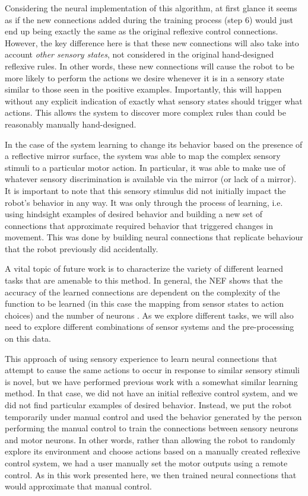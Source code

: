\documentclass{frontiersSCNS}
\begin{document}
Considering the neural implementation of this algorithm, at first glance it 
seems as if the new connections added during the
training process (step 6) would just end up being 
exactly the same as the original reflexive control connections. However, the 
key difference here is that these new connections will also take into 
account \textit{other sensory states}, not considered in the original 
hand-designed reflexive rules. In other words, these new connections will 
cause the robot to be more likely to perform the actions we desire whenever it is in a sensory state similar to those seen in the positive examples. 
Importantly, this will happen without any explicit indication of exactly what 
sensory states should trigger what actions.  This allows the system to
discover more complex rules than could be reasonably manually hand-designed.

In the case of the system learning to change its behavior based on the 
presence of a reflective mirror surface, the system was able to map the 
complex sensory stimuli to a particular motor action.  In particular, it
was able to make use of whatever sensory discrimination is available via
the mirror (or lack of a mirror).  It is important to note that this sensory 
stimulus did not initially impact the robot's behavior in any way. It was 
only through the process of learning, i.e. using hindsight examples of desired 
behavior and building a new set of connections that approximate required 
behavior that triggered changes in movement.  This was done by building neural
connections that replicate behaviour that the robot previously did accidentally.

A vital topic of future work is to characterize the variety of different
learned tasks that are amenable to this method.  In general, the NEF shows
that the accuracy of the learned connections are dependent on the complexity
of the function to be learned (in this case the mapping from sensor states to
action choices) and the number of neurons \citep{eliasmith2004neural}.  As we explore different tasks,
we will also need to explore different combinations of sensor systems and
the pre-processing on this data.  

This approach of using sensory experience to learn neural connections
that attempt to cause the same actions to occur in response to similar
sensory stimuli is novel, but we have performed previous work \citep{conradt2014trainable}
with a somewhat similar learning method. In that case, we did not have an 
initial reflexive control system, and we did not find particular examples of 
desired behavior. Instead, we put the robot temporarily under manual control 
and used the behavior generated by the person performing the manual control 
to train the connections between sensory neurons and motor neurons.  In other
words, rather than allowing the robot to randomly explore its environment and
choose actions based on a manually created reflexive control system, we had
a user manually set the motor outputs using a remote control.  As in this work
presented here, we then trained neural connections that would approximate that
manual control.  
\end{document}
